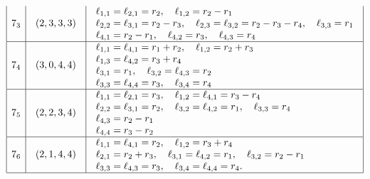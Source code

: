 \documentclass[11pt]{amsart}
\theoremstyle{definition}
\newcommand{\1}{{\mathbf 1}}
\numberwithin{equation}{section}
\begin{document}
\begin{figure}[h]
\begin{equation*}
\begin{array}{|c|c|l|l|}
      7_3 &
      \begin{array}{l}
        (2, 3, 3, 3)
      \end{array} & 
      \begin{array}{l}
        \ell_{1,1}=\ell_{2,1}=r_2,\quad \ell_{1,2}=r_2-r_1 \\
        \ell_{2,2}=\ell_{3,1}=r_2-r_3,\quad \ell_{2,3}= \ell_{3,2}=r_2-r_3-r_4,\quad \ell_{3,3}=r_1 \\
        \ell_{4,1}=r_2-r_1,\quad \ell_{4,2}=r_3,\quad \ell_{4,3}=r_4
      \end{array} \\ \hline

      7_4 &
      \begin{array}{l}
        (3, 0, 4, 4)
      \end{array} & 
      \begin{array}{l}
        \ell_{1,1}=\ell_{4,1}=r_1+r_2,\quad \ell_{1,2}=r_2+r_3 \\
        \ell_{1,3}=\ell_{4,2}=r_3+r_4 \\
        \ell_{3,1}=r_1,\quad \ell_{3,2}=\ell_{4,3}=r_2 \\
        \ell_{3,3}=\ell_{4,4}=r_3,\quad \ell_{3,4}=r_4
      \end{array} \\ \hline

      7_5 &
      \begin{array}{l}
        (2, 2, 3, 4)
      \end{array} & 
      \begin{array}{l}
        \ell_{1,1}=\ell_{2,1}=r_3,\quad \ell_{1,2}=\ell_{4,1}=r_3-r_4 \\
        \ell_{2,2}=\ell_{3,1}=r_2,\quad \ell_{3,2}=\ell_{4,2}=r_1,\quad \ell_{3,3}=r_4 \\
        \ell_{4,3}=r_2-r_1 \\
        \ell_{4,4}=r_3-r_2
      \end{array} \\ \hline

      7_6 &
      \begin{array}{l}
        (2, 1, 4, 4)
      \end{array} & 
      \begin{array}{l}
        \ell_{1,1}=\ell_{4,1}=r_2,\quad \ell_{1,2}=r_3+r_4 \\
        \ell_{2,1}=r_2+r_3,\quad \ell_{3,1}=\ell_{4,2}=r_1,\quad \ell_{3,2}=r_2-r_1 \\
        \ell_{3,3}=\ell_{4,3}=r_3,\quad \ell_{3,4}=\ell_{4,4}=r_4.        
      \end{array} \\ \hline


\end{array}
\end{equation*}
\end{figure}
\end{document}
